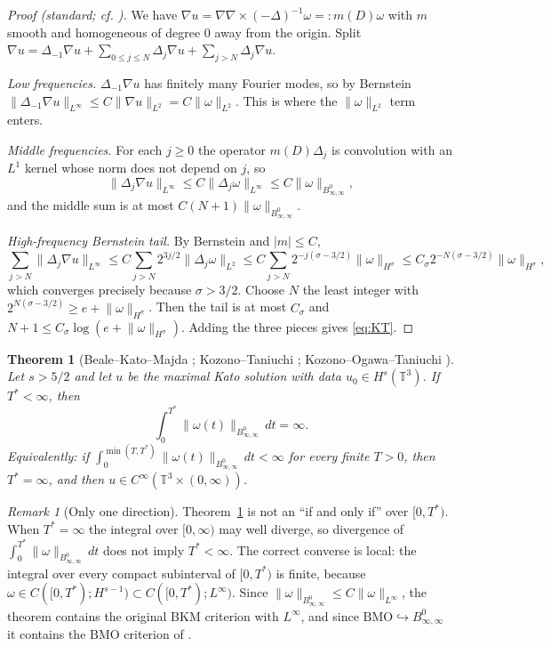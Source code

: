 \documentclass[11pt,reqno]{amsart}
\newtheorem{theorem}{Theorem}
\theoremstyle{definition}
\theoremstyle{remark}
\newtheorem{remark}[lemma]{Remark}
\newcommand{\T}{\mathbb{T}^3}
\newcommand{\Bz}{B^0_{\infty,\infty}}
\newcommand{\norm}[1]{\lVert #1\rVert}
\newcommand{\abs}[1]{\lvert #1\rvert}
\newcommand{\curl}{\nabla\times}
\begin{document}
\begin{proof}[Proof (standard; cf. {\cite{BKM1984,KT2000,KOT2002}})]
We have $\nabla u=\nabla\curl(-\Delta)^{-1}\omega=:m(D)\omega$ with $m$ smooth and homogeneous of degree $0$ away from the origin. Split $\nabla u=\Delta_{-1}\nabla u+\sum_{0\le j\le N}\Delta_j\nabla u+\sum_{j>N}\Delta_j\nabla u$.

\emph{Low frequencies.} $\Delta_{-1}\nabla u$ has finitely many Fourier modes, so by Bernstein $\norm{\Delta_{-1}\nabla u}_{L^\infty}\le C\norm{\nabla u}_{L^2}=C\norm{\omega}_{L^2}$. This is where the $\norm{\omega}_{L^2}$ term enters.

\emph{Middle frequencies.} For each $j\ge0$ the operator $m(D)\Delta_j$ is convolution with an $L^1$ kernel whose norm does not depend on $j$, so
\[
\norm{\Delta_j\nabla u}_{L^\infty}\le C\norm{\Delta_j\omega}_{L^\infty}\le C\norm{\omega}_{\Bz},
\]
and the middle sum is at most $C(N+1)\norm{\omega}_{\Bz}$.

\emph{High-frequency Bernstein tail.} By Bernstein and $\abs{m}\le C$,
\[
\sum_{j>N}\norm{\Delta_j\nabla u}_{L^\infty}\le C\sum_{j>N}2^{3j/2}\norm{\Delta_j\omega}_{L^2}\le C\sum_{j>N}2^{-j(\sigma-3/2)}\norm{\omega}_{H^\sigma}\le C_\sigma2^{-N(\sigma-3/2)}\norm{\omega}_{H^\sigma},
\]
which converges precisely because $\sigma>3/2$. Choose $N$ the least integer with $2^{N(\sigma-3/2)}\ge e+\norm{\omega}_{H^\sigma}$. Then the tail is at most $C_\sigma$ and $N+1\le C_\sigma\log(e+\norm{\omega}_{H^\sigma})$. Adding the three pieces gives \eqref{eq:KT}.
\end{proof}

\begin{theorem}[Beale--Kato--Majda {\cite{BKM1984}}; Kozono--Taniuchi {\cite{KT2000}}; Kozono--Ogawa--Taniuchi {\cite{KOT2002}}]\label{thm:A}
Let $s>5/2$ and let $u$ be the maximal Kato solution with data $u_0\in H^s(\T)$. If $T^*<\infty$, then
\[
\int_0^{T^*}\norm{\omega(t)}_{\Bz}\,dt=\infty .
\]
Equivalently: if $\int_0^{\min(T,T^*)}\norm{\omega(t)}_{\Bz}\,dt<\infty$ for every finite $T>0$, then $T^*=\infty$, and then $u\in C^\infty(\T\times(0,\infty))$.
\end{theorem}

\begin{remark}[Only one direction]\label{rem:onedir}
Theorem~\ref{thm:A} is not an ``if and only if'' over $[0,T^*)$. When $T^*=\infty$ the integral over $[0,\infty)$ may well diverge, so divergence of $\int_0^{T^*}\norm{\omega}_{\Bz}\,dt$ does not imply $T^*<\infty$. The correct converse is local: the integral over every compact subinterval of $[0,T^*)$ is finite, because $\omega\in C([0,T^*);H^{s-1})\subset C([0,T^*);L^\infty)$. Since $\norm{\omega}_{\Bz}\le C\norm{\omega}_{L^\infty}$, the theorem contains the original BKM criterion with $L^\infty$, and since $\mathrm{BMO}\hookrightarrow\Bz$ it contains the $\mathrm{BMO}$ criterion of \cite{KT2000}.
\end{remark}
\end{document}
